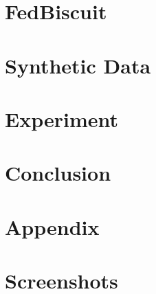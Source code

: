 \documentclass[11pt,titlepage]{report}
\begin{document}
\chapter{FedBiscuit}


\chapter{Synthetic Data}


\chapter{Experiment}


\chapter{Conclusion}


\clearpage
\appendix
\chapter{Appendix}


\chapter{Screenshots}



\clearpage
\pagestyle{numberonly}
\printbibliography
\end{document}

